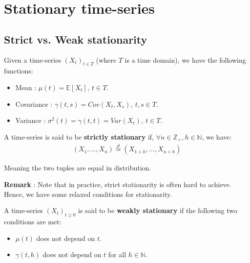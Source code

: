 \newpage
\section{Stationary time-series}
\subsection{Strict vs. Weak stationarity}

\begin{definition}
    Given a time-series $(X_t)_{t\in T}$ (where $T$ is a time domain), we have the following functions:
    \begin{itemize}
        \item Mean : $\mu(t)=\mathbb{E}[X_t], \ t\in T$.
        \item Covariance : $\gamma(t, s) = Cov(X_t, X_s), \ t, s\in T$.
        \item Variance : $\sigma^2(t) = \gamma(t,t)= Var(X_t), \ t\in T$.
    \end{itemize}
\end{definition}


\begin{definition}
    A time-series is said to be \textbf{strictly stationary} if, $\forall n \in \mathbb{Z}_+, h \in \mathbb{N}$, we have:
    \begin{align*}
        (X_1, \dots, X_n) \stackrel{d}{\simeq} (X_{1+h}, \dots, X_{n+h}) 
    \end{align*}

    \noindent Meaning the two tuples are equal in distribution.
\end{definition}

\noindent \textbf{Remark} : Note that in practice, strict stationarity is often hard to achieve. Hence, we have some relaxed conditions for stationarity.

\begin{definition}
    A time-series $(X_t)_{t\ge0}$ is said to be \textbf{weakly stationary} if the following two conditions are met:
    \begin{itemize}
        \item $\mu(t)$ does not depend on $t$.
        \item $\gamma(t, h)$ does not depend on $t$ for all $h\in\mathbb{N}$.
    \end{itemize}
\end{definition}